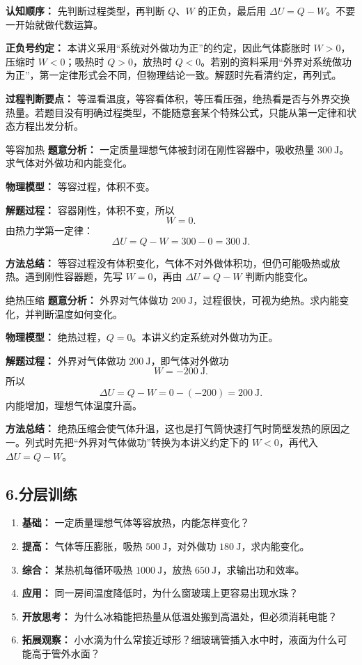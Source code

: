 \textbf{认知顺序：} 先判断过程类型，再判断 $Q$、$W$ 的正负，最后用 $\Delta U=Q-W$。不要一开始就做代数运算。

\textbf{正负号约定：} 本讲义采用“系统对外做功为正”的约定，因此气体膨胀时 $W>0$，压缩时 $W<0$；吸热时 $Q>0$，放热时 $Q<0$。若别的资料采用“外界对系统做功为正”，第一定律形式会不同，但物理结论一致。解题时先看清约定，再列式。

\textbf{过程判断要点：} 等温看温度，等容看体积，等压看压强，绝热看是否与外界交换热量。若题目没有明确过程类型，不能随意套某个特殊公式，只能从第一定律和状态方程出发分析。

\begin{examplebox}{等容加热}
\textbf{题意分析：} 一定质量理想气体被封闭在刚性容器中，吸收热量 $300\ \mathrm{J}$。求气体对外做功和内能变化。

\textbf{物理模型：} 等容过程，体积不变。

\textbf{解题过程：}
容器刚性，体积不变，所以
\[
W=0.
\]
由热力学第一定律：
\[
\Delta U=Q-W=300-0=300\ \mathrm{J}.
\]

\textbf{方法总结：} 等容过程没有体积变化，气体不对外做体积功，但仍可能吸热或放热。遇到刚性容器题，先写 $W=0$，再由 $\Delta U=Q-W$ 判断内能变化。
\end{examplebox}

\begin{examplebox}{绝热压缩}
\textbf{题意分析：} 外界对气体做功 $200\ \mathrm{J}$，过程很快，可视为绝热。求内能变化，并判断温度如何变化。

\textbf{物理模型：} 绝热过程，$Q=0$。本讲义约定系统对外做功为正。

\textbf{解题过程：}
外界对气体做功 $200\ \mathrm{J}$，即气体对外做功
\[
W=-200\ \mathrm{J}.
\]
所以
\[
\Delta U=Q-W=0-(-200)=200\ \mathrm{J}.
\]
内能增加，理想气体温度升高。

\textbf{方法总结：} 绝热压缩会使气体升温，这也是打气筒快速打气时筒壁发热的原因之一。列式时先把“外界对气体做功”转换为本讲义约定下的 $W<0$，再代入 $\Delta U=Q-W$。
\end{examplebox}

\subsection*{6.\quad 分层训练}

\begin{enumerate}
  \item \textbf{基础：} 一定质量理想气体等容放热，内能怎样变化？
  \item \textbf{提高：} 气体等压膨胀，吸热 $500\ \mathrm{J}$，对外做功 $180\ \mathrm{J}$，求内能变化。
  \item \textbf{综合：} 某热机每循环吸热 $1000\ \mathrm{J}$，放热 $650\ \mathrm{J}$，求输出功和效率。
  \item \textbf{应用：} 同一房间温度降低时，为什么窗玻璃上更容易出现水珠？
  \item \textbf{开放思考：} 为什么冰箱能把热量从低温处搬到高温处，但必须消耗电能？
  \item \textbf{拓展观察：} 小水滴为什么常接近球形？细玻璃管插入水中时，液面为什么可能高于管外水面？
\end{enumerate}

